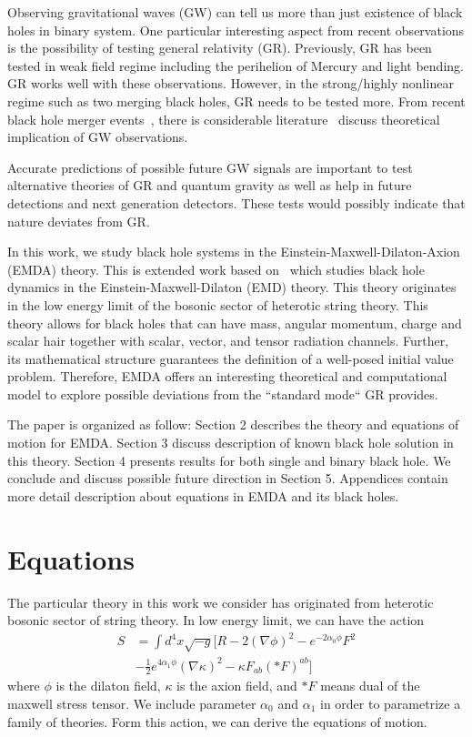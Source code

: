 \documentclass[%
 reprint,
 amsmath,amssymb,
 aps,
]{revtex4-1}
\begin{document}
Observing gravitational waves (GW) can tell us more than just existence of black holes in binary system. One particular interesting aspect from recent observations is the possibility of testing general relativity (GR). Previously, GR has been tested in weak field regime including the perihelion of Mercury and light bending. GR works well with these observations. However, in the strong/highly nonlinear regime such as two merging black holes, GR needs to be tested more. From recent black hole merger events~\cite{ligo.prl.2016, ligo.prl2.2016, ligo.prl3.2017, ligo.apj.2017, ligo.prl4.2017}, there is considerable literature~\cite{PhysRevLett.116.221101,PhysRevD.94.084002} discuss theoretical implication of GW observations.

Accurate predictions of possible future GW signals are important to test alternative theories of GR and quantum gravity as well as help in future detections and next generation detectors. These tests would possibly indicate that nature deviates from GR. 

In this work, we study black hole systems in the Einstein-Maxwell-Dilaton-Axion (EMDA) theory. This is extended work based on~\cite{PhysRevD.97.064032} which studies black hole dynamics in the Einstein-Maxwell-Dilaton (EMD) theory. This theory originates in the low energy limit of the bosonic sector of heterotic string theory. This theory allows for black holes that can have mass, angular momentum, charge and scalar hair together with scalar, vector, and tensor radiation channels. Further, its mathematical structure guarantees the definition of a well-posed initial value problem. Therefore, EMDA offers an interesting theoretical and computational model to explore possible deviations from the ``standard mode`` GR provides.

The paper is organized as follow: Section 2 describes the theory and equations of motion for EMDA. Section 3 discuss description of known black hole solution in this theory. Section 4 presents results for both single and binary black hole. We conclude and discuss possible future direction in Section 5. Appendices contain more detail description about equations in EMDA and its black holes.

\section{Equations}
The particular theory in this work we consider has originated from heterotic bosonic sector of string theory. In low energy limit, we can have the action
\begin{align}
S&=\int d^4 x \sqrt{-g} \Bigg[R - 2 (\nabla \phi)^2 - e^{-2 \alpha_0 \phi} F^2 \nonumber \\
   &-\frac{1}{2} e^{4 \alpha_1 \phi} (\nabla \kappa)^2 - \kappa F_{ab} ( \ast  F )^{ab} \Bigg]
\end{align}
where $\phi$ is the dilaton field, $\kappa$ is the axion field, and $\ast F$ means dual of the maxwell stress tensor. We include parameter $\alpha_0$ and $\alpha_1$ in order to parametrize a family of theories. Form this action, we can derive the equations of motion. 
\end{document}
